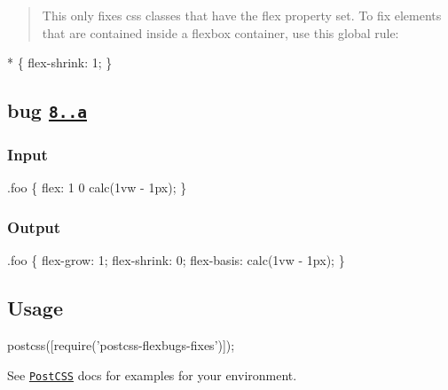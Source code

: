 \begin{quote}
This only fixes css classes that have the {\ttfamily flex} property set. To fix elements that are contained inside a flexbox container, use this global rule\+: \end{quote}

\begin{DoxyCode}
* \{
    flex-shrink: 1;
\}
\end{DoxyCode}


\subsection*{bug \href{https://github.com/philipwalton/flexbugs/blob/master/README.md#8-flex-basis-doesnt-support-calc}{\tt 8..\+a}}

\subsubsection*{Input}


\begin{DoxyCode}
.foo \{ flex: 1 0 calc(1vw - 1px); \}
\end{DoxyCode}


\subsubsection*{Output}


\begin{DoxyCode}
.foo \{
  flex-grow: 1;
  flex-shrink: 0;
  flex-basis: calc(1vw - 1px);
\}
\end{DoxyCode}


\subsection*{Usage}


\begin{DoxyCode}
postcss([require('postcss-flexbugs-fixes')]);
\end{DoxyCode}


See \href{https://github.com/postcss/postcss}{\tt Post\+C\+SS} docs for examples for your environment. 